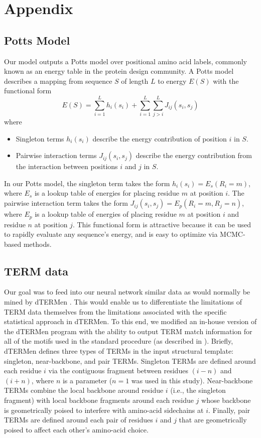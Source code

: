 \documentclass{article}
\begin{document}
\newpage

\section*{Appendix}
\subsection*{Potts Model}
Our model outputs a Potts model over positional amino acid labels,  commonly known as an energy table in the protein design community. A Potts model describes a mapping from sequence $S$ of length $L$ to energy $E(S)$ with the functional form
$$ E(S) = \sum_{i=1}^L h_i(s_i) + \sum_{i=1}^L \sum_{j>i}^L J_{ij}(s_i, s_j) $$
where 
\begin{itemize}
    \item Singleton terms $h_i(s_i)$ describe the energy contribution of position $i$ in $S$.
    \item Pairwise interaction terms $J_{ij}(s_i, s_j)$ describe the energy contribution from the interaction between positions $i$ and $j$ in $S$.
\end{itemize}

In our Potts model, the singleton term takes the form $h_i(s_i) = E_s(R_i = m)$, where $E_s$ is a lookup table of energies for placing residue $m$ at position $i$. The pairwise interaction term takes the form $J_{ij}(s_i, s_j) = E_p(R_i=m, R_j=n)$, where $E_p$ is a lookup table of energies of placing residue $m$ at position $i$ and residue $n$ at position $j$. This functional form is attractive because it can be used to rapidly evaluate any sequence's energy, and is easy to optimize via MCMC-based methods.


\subsection*{TERM data}
Our goal was to feed into our neural network similar data as would normally be mined by dTERMen \citep{Zhou2020}. This would enable us to differentiate the limitations of TERM data themselves from the limitations associated with the specific statistical approach in dTERMen. To this end, we modified an in-house version of the dTERMen program with the ability to output TERM match information for all of the motifs used in the standard procedure (as described in \citet{Zhou2020}). Briefly, dTERMen defines three types of TERMs in the input structural template: singleton, near-backbone, and pair TERMs. Singleton TERMs are defined around each residue $i$ via the contiguous fragment between residues $(i-n)$ and $(i+n)$, where $n$ is a parameter ($n=1$ was used in this study). Near-backbone TERMs combine the local backbone around residue $i$ (i.e., the singleton fragment) with local backbone fragments around each residue $j$ whose backbone is geometrically poised to interfere with amino-acid sidechains at $i$. Finally, pair TERMs are defined around each pair of residues $i$ and $j$ that are geometrically poised to affect each other's amino-acid choice.
\end{document}
